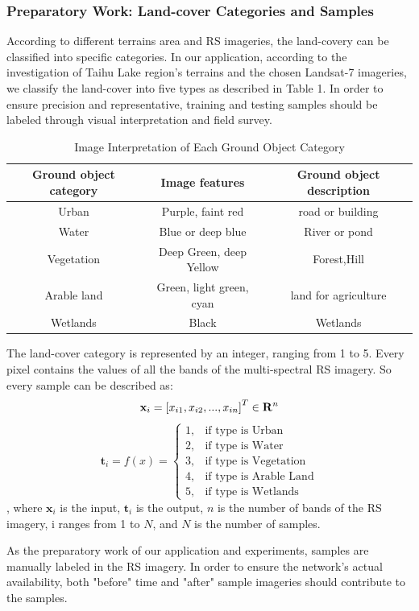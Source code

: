 \documentclass{elsart}
\begin{document}
\subsubsection{Preparatory Work: Land-cover Categories and Samples}
According to different terrains area and RS imageries, the land-covery can be classified into specific categories. 
In our application, according to the investigation of Taihu Lake region's terrains and the chosen Landsat-7 imageries, we classify the land-cover into five types as described in Table 1.
In order to ensure precision and representative, training and testing samples should be labeled through visual interpretation and field survey\cite{YuXiu-Lan1999}.
\begin{table}[h]
\scriptsize{
\begin{center}
\begin{tabular}[bt]{|c|c|c|}\hline
Ground object category	& Image features	& Ground object description \\ \hline
Urban			& Purple, faint red	& road or building \\ \hline
Water			& Blue or deep blue	&River or pond \\ \hline
Vegetation		& Deep Green, deep Yellow		& Forest,Hill \\ \hline
Arable land		& Green, light green, cyan	& land for agriculture \\ \hline
Wetlands		& Black		& Wetlands \\ \hline
\end{tabular}
\caption{Image Interpretation of Each Ground Object Category}\label{categories}
\end{center}
}
\end{table}
\par
The land-cover category is represented by an integer, ranging from 1 to 5.
Every pixel contains the values of all the bands of the multi-spectral RS imagery.
So every sample can be described as:
$$
\mathbf{x}_i=\left[x_{i1},x_{i2},...,x_{in}  \right]^T \in \mathbf{R}^n  \\
$$
$$
\mathbf{t}_i = f(x) = 
	\begin{cases} 
	1, & \mbox{if type is Urban} \\ 
	2, & \mbox{if type is Water} \\
	3, & \mbox{if type is Vegetation} \\
	4, & \mbox{if type is Arable Land} \\
	5, & \mbox{if type is Wetlands} 
	\end{cases}
$$,
where $\mathbf{x}_i$ is the input, $\mathbf{t}_i$ is the output, $n$ is the number of bands of the RS imagery, i ranges from 1 to $N$, and $N$ is the number of samples.
\par
As the preparatory work of our application and experiments, samples are manually labeled in the RS imagery.
In order to ensure the network's actual availability, both "before" time and "after" sample imageries should contribute to the samples. 
\par
\end{document}
